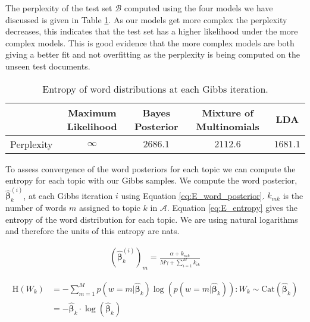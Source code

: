 \documentclass[11pt]{article}
\begin{document}
The perplexity of the test set $\mathcal{B}$ computed using the four models we have discussed is given in Table \ref{tab:E_perplexity}. As our models get more complex the perplexity decreases, this indicates that the test set has a higher likelihood under the more complex models. This is good evidence that the more complex models are both giving a better fit and not overfitting as the perplexity is being computed on the unseen test documents.

\begin{table}
    \centering
    \small
    \begin{tabular}{|c|cccc|}
        \hline
         & Maximum Likelihood & Bayes Posterior & Mixture of Multinomials & LDA \\
        \hline
        Perplexity & $\infty$ & $2686.1$ & $2112.6$ & $1681.1$\\
        \hline
    \end{tabular}
    \caption{Entropy of word distributions at each Gibbs iteration.}
    \label{tab:E_perplexity}
\end{table}

To assess convergence of the word posteriors for each topic we can compute the entropy for each topic with our Gibbs samples. We compute the word posterior, $\boldsymbol{\hat \beta}_k^{(i)}$, at each Gibbs iteration $i$ using Equation \ref{eq:E_word_posterior}. $k_{mk}$ is the number of words $m$ assigned to topic $k$ in $\mathcal{A}$. Equation \ref{eq:E_entropy} gives the entropy of the word distribution for each topic. We are using natural logarithms and therefore the units of this entropy are nats.

\begin{equation}
    \begin{aligned}
        (\boldsymbol{\hat \beta}_k^{(i)})_m = \frac{\alpha + k_{mk}}{M \gamma + \sum_{i=1}^{M} k_{ik}}
    \end{aligned}
    \label{eq:E_word_posterior}
\end{equation}

\begin{equation}
    \begin{aligned}
        \text{H}(W_k) &= -\sum_{m=1}^{M} p(w = m | \boldsymbol{\hat \beta}_k) \log(p(w = m | \boldsymbol{\hat \beta}_k)) : W_k \sim \text{Cat}(\boldsymbol{\hat \beta}_k) \\
          &= - \boldsymbol{\hat \beta}_k \cdot \log(\boldsymbol{\hat \beta}_k)
    \end{aligned}
    \label{eq:E_entropy}
\end{equation}
\end{document}
